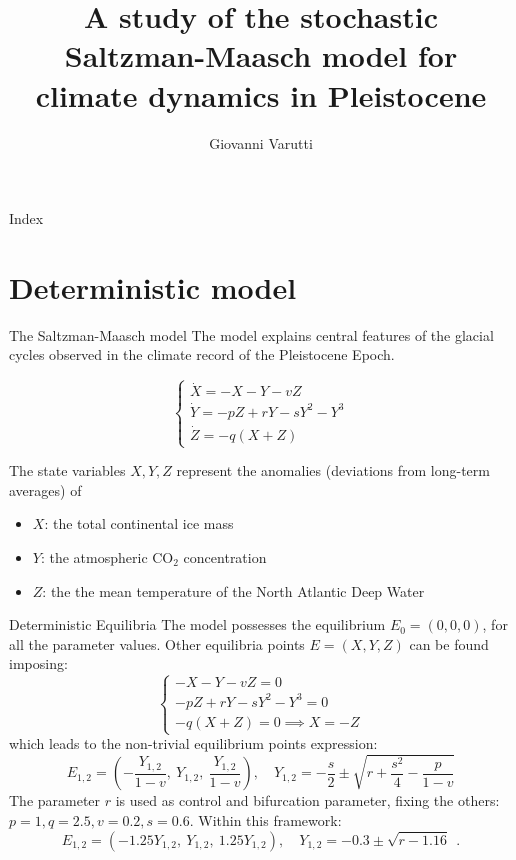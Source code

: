 \documentclass[10pt]{beamer}
\title{A study of the stochastic Saltzman-Maasch model for climate dynamics in Pleistocene}
\author{Giovanni Varutti}
\begin{document}
\begin{frame}
	\maketitle
\end{frame}

\begin{frame}{Index}
	\tableofcontents
\end{frame}

\section{Deterministic model}

\begin{frame}{The Saltzman-Maasch model}
	The model explains central features of the glacial cycles observed in the 
	climate record of the Pleistocene Epoch.

	\[
		\begin{cases}
			\dot{X} = -X -Y -vZ \\ 
			\dot{Y} = -pZ + rY -sY^2 -Y^3 \\
			\dot{Z} = -q(X+Z)
		\end{cases}
	\]

	The state variables $X, Y, Z$ represent the anomalies (deviations
	from long-term averages) of
	\begin{itemize}
		\item $X$: the total continental ice mass
		\item $Y$: the atmospheric $\text{CO}_2$ concentration
		\item $Z$: the the mean temperature of the North Atlantic Deep Water
	\end{itemize}
\end{frame}

\begin{frame}{Deterministic Equilibria}
	The model possesses the equilibrium $E_0 = (0, 0, 0)$, for all the parameter values.
	Other equilibria points $E = ( X, Y, Z)$ can be found imposing:
	\[
		\begin{cases}
			-X -Y -vZ = 0 \\ 
			-pZ + rY -sY^2 -Y^3 = 0 \\
			-q(X+Z) = 0 \implies X = -Z
		\end{cases}
	\]
	which leads to the non-trivial equilibrium points expression:
	\[
	E_{1,2} = \left(-\frac{Y_{1,2}}{1-v}, \ Y_{1,2}, \ \frac{Y_{1,2}}{1-v}\right), \quad Y_{1,2} = -\frac{s}{2} \pm \sqrt{r + \frac{s^2}{4} - \frac{p}{1-v}}
	\]
	The parameter $r$ is used as control and bifurcation parameter, fixing the others: $p = 1, q = 2.5, v = 0.2, s = 0.6$.
	Within this framework:
	\[
	E_{1,2} = \left(-1.25Y_{1,2}, \ Y_{1,2}, \ 1.25Y_{1,2} \right), \quad Y_{1,2} = -0.3 \pm \sqrt{r - 1.16} \ \ .
	\]
\end{frame}
\end{document}
